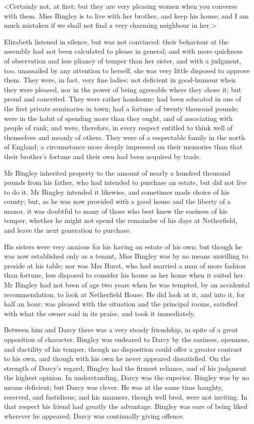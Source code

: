 <Certainly not, at first; but they are very pleasing women when you converse with them. Miss Bingley is to live with her brother, and keep his house; and I am much mistaken if we shall not find a very charming neighbour in her.>

Elizabeth listened in silence, but was not convinced: their behaviour at the assembly had not been calculated to please in general; and with more quickness of observation and less pliancy of temper than her sister, and with a judgment, too, unassailed by any attention to herself, she was very little disposed to approve them. They were, in fact, very fine ladies; not deficient in good-humour when they were pleased, nor in the power of being agreeable where they chose it; but proud and conceited. They were rather handsome; had been educated in one of the first private seminaries in town; had a fortune of twenty thousand pounds; were in the habit of spending more than they ought, and of associating with people of rank; and were, therefore, in every respect entitled to think well of themselves and meanly of others. They were of a respectable family in the north of England; a circumstance more deeply impressed on their memories than that their brother's fortune and their own had been acquired by trade.

Mr Bingley inherited property to the amount of nearly a hundred thousand pounds from his father, who had intended to purchase an estate, but did not live to do it. Mr Bingley intended it likewise, and sometimes made choice of his county; but, as he was now provided with a good house and the liberty of a manor, it was doubtful to many of those who best knew the easiness of his temper, whether he might not spend the remainder of his days at Netherfield, and leave the next generation to purchase.

His sisters were very anxious for his having an estate of his own; but though he was now established only as a tenant, Miss Bingley was by no means unwilling to preside at his table; nor was Mrs Hurst, who had married a man of more fashion than fortune, less disposed to consider his house as her home when it suited her. Mr Bingley had not been of age two years when he was tempted, by an accidental recommendation, to look at Netherfield House. He did look at it, and into it, for half an hour; was pleased with the situation and the principal rooms, satisfied with what the owner said in its praise, and took it immediately.

Between him and Darcy there was a very steady friendship, in spite of a great opposition of character. Bingley was endeared to Darcy by the easiness, openness, and ductility of his temper, though no disposition could offer a greater contrast to his own, and though with his own he never appeared dissatisfied. On the strength of Darcy's regard, Bingley had the firmest reliance, and of his judgment the highest opinion. In understanding, Darcy was the superior. Bingley was by no means deficient; but Darcy was clever. He was at the same time haughty, reserved, and fastidious; and his manners, though well bred, were not inviting. In that respect his friend had greatly the advantage. Bingley was sure of being liked wherever he appeared; Darcy was continually giving offence.

